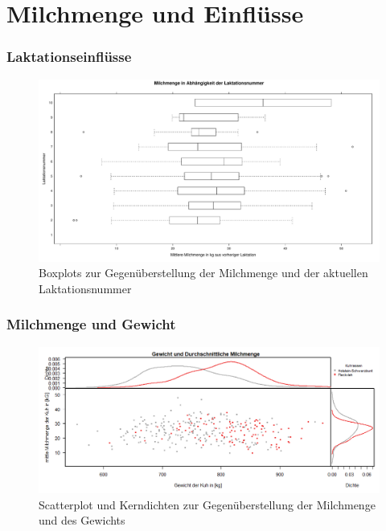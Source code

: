 \documentclass{beamer}
\begin{document}
	\section{Milchmenge und Einflüsse}
	\begin{frame}
		\frametitle{Laktationseinflüsse}
		\begin{figure}[htbp]
			\centering
			\includegraphics[scale = 0.333]{lattice.pdf}
			\vspace{-0.6cm}
			\caption{Boxplots zur Gegenüberstellung der Milchmenge und der aktuellen Laktationsnummer}
		\end{figure}
	\end{frame}


	\begin{frame}
		\frametitle{Milchmenge und Gewicht}
		\begin{figure}[h]
			\centering
			\includegraphics[width=1\textwidth]{Scatter und Kerndichte Milchmenge~Gewicht.png}
			\vspace{-0.6cm}
			\caption{Scatterplot und Kerndichten zur Gegenüberstellung der Milchmenge und des Gewichts}
		\end{figure}
	\end{frame}
\end{document}
